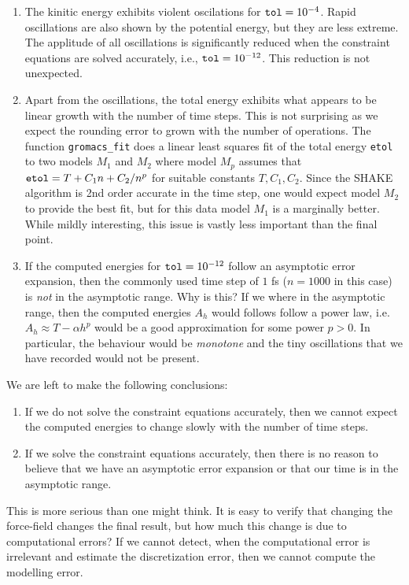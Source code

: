 \documentclass[runningheads]{llncs}
\begin{document}
\begin{enumerate}
\item The kinitic energy exhibits violent oscilations for ${\tt tol} = 10^{-4}$. Rapid oscillations are also shown by the potential energy, but they are less extreme. The applitude of all oscillations is significantly reduced when the constraint equations are solved accurately, i.e., ${\tt tol} = 10^{-12}$. This reduction is not unexpected.
\item Apart from the oscillations, the total energy exhibits what appears to be linear growth with the number of time steps. This is not surprising as we expect the rounding error to grown with the number of operations. The function {\tt gromacs\_fit} does a linear least squares fit of the total energy {\tt etol} to two models $M_1$ and $M_2$ where model $M_p$ assumes that ${\tt etol} = T + C_1n + C_2/n^p$ for suitable constants $T, C_1, C_2$. Since the SHAKE algorithm is 2nd order accurate in the time step, one would expect model $M_2$ to provide the best fit, but for this data model $M_1$ is a marginally better. While mildly interesting, this issue is vastly less important than the final point.
\item If the computed energies for ${\tt tol} = 10 ^{-12}$ follow an asymptotic error expansion, then the commonly used time step of $1$ fs ($n=1000$ in this case) is \emph{not} in the asymptotic range. Why is this? If we where in the asymptotic range, then the computed energies $A_h$ would follows follow a power law, i.e. $A_h \approx T - \alpha h^p$ would be a good approximation for some power $p>0$. In particular, the behaviour would be \emph{monotone} and the tiny oscillations that we have recorded would not be present.
\end{enumerate}

We are left to make the following conclusions:
\begin{enumerate}
  \item If we do not solve the constraint equations accurately, then we cannot expect the computed energies to change slowly with the number of time steps.
  \item If we solve the constraint equations accurately, then there is no reason to believe that we have an asymptotic error expansion or that our time is in the asymptotic range.
  \end{enumerate}
  This is more serious than one might think. It is easy to verify that changing the force-field changes the final result, but how much this change is due to computational errors? If we cannot detect, when the computational error is irrelevant and estimate the discretization error, then we cannot compute the modelling error.
\end{document}
